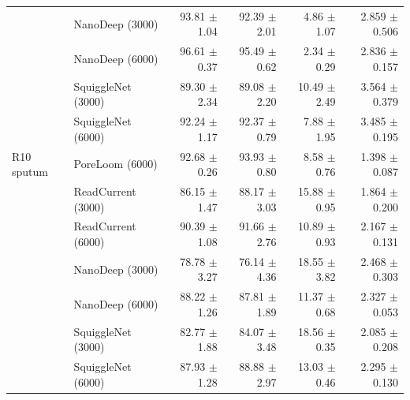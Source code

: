 \begin{tabular}{@{}llrrrr@{}}
 & NanoDeep (3000) & 93.81 $\pm$ 1.04 & 92.39 $\pm$ 2.01 & 4.86 $\pm$ 1.07 & 2.859 $\pm$ 0.506\\
 & NanoDeep (6000) & 96.61 $\pm$ 0.37 & 95.49 $\pm$ 0.62 & 2.34 $\pm$ 0.29 & 2.836 $\pm$ 0.157\\
 & SquiggleNet (3000) & 89.30 $\pm$ 2.34 & 89.08 $\pm$ 2.20 & 10.49 $\pm$ 2.49 & 3.564 $\pm$ 0.379\\
 & SquiggleNet (6000) & 92.24 $\pm$ 1.17 & 92.37 $\pm$ 0.79 & 7.88 $\pm$ 1.95 & 3.485 $\pm$ 0.195\\
\addlinespace
R10 sputum & PoreLoom (6000) & 92.68 $\pm$ 0.26 & 93.93 $\pm$ 0.80 & 8.58 $\pm$ 0.76 & 1.398 $\pm$ 0.087\\
 & ReadCurrent (3000) & 86.15 $\pm$ 1.47 & 88.17 $\pm$ 3.03 & 15.88 $\pm$ 0.95 & 1.864 $\pm$ 0.200\\
 & ReadCurrent (6000) & 90.39 $\pm$ 1.08 & 91.66 $\pm$ 2.76 & 10.89 $\pm$ 0.93 & 2.167 $\pm$ 0.131\\
 & NanoDeep (3000) & 78.78 $\pm$ 3.27 & 76.14 $\pm$ 4.36 & 18.55 $\pm$ 3.82 & 2.468 $\pm$ 0.303\\
 & NanoDeep (6000) & 88.22 $\pm$ 1.26 & 87.81 $\pm$ 1.89 & 11.37 $\pm$ 0.68 & 2.327 $\pm$ 0.053\\
 & SquiggleNet (3000) & 82.77 $\pm$ 1.88 & 84.07 $\pm$ 3.48 & 18.56 $\pm$ 0.35 & 2.085 $\pm$ 0.208\\
 & SquiggleNet (6000) & 87.93 $\pm$ 1.28 & 88.88 $\pm$ 2.97 & 13.03 $\pm$ 0.46 & 2.295 $\pm$ 0.130\\
\bottomrule\end{tabular}

